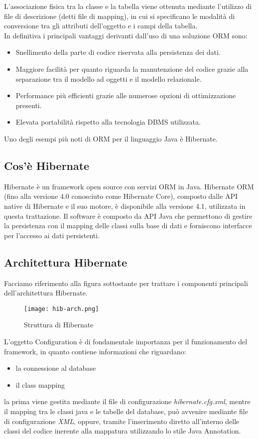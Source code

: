 L'associazione fisica tra la classe e la tabella viene ottenuta mediante l'utilizzo di file di descrizione (detti file di mapping), in cui si specificano le modalit\`a di conversione tra gli attributi dell'oggetto e i campi della tabella.\\In definitiva i principali vantaggi derivanti dall'uso di una soluzione ORM sono:

\begin{itemize}
\item Snellimento della parte di codice riservata alla persistenza dei dati.
\item Maggiore facilit\`a per quanto riguarda la manutenzione del codice grazie alla separazione tra il modello ad oggetti e il modello relazionale.
\item Performance pi\`u efficienti grazie alle numerose opzioni di ottimizzazione presenti.
\item Elevata portabilit\`a rispetto alla tecnologia DBMS utilizzata.
\end{itemize}

Uno degli esempi pi\`u noti di ORM per il linguaggio Java \`e Hibernate.
\subsection{Cos'\`e Hibernate}
Hibernate \`e un framework open source
con servizi ORM in Java. Hibernate ORM (fino alla versione 4.0 conosciuto come Hibernate Core), composto dalle API native di Hibernate e il suo motore, \`e disponibile alla versione 4.1, utilizzata in questa trattazione.
Il software \`e composto da API Java che permettono di gestire la persistenza con il mapping delle classi sulla base di dati e forniscono interfacce per l'accesso ai dati persistenti.
\subsection{Architettura Hibernate}
Facciamo riferimento alla figura sottostante per  trattare i componenti principali dell'architettura Hibernate.

\FloatBarrier
\begin{figure}[H]
\centering%
\texttt{[image: hib-arch.png]}%
\caption{Struttura di Hibernate}\label{fig:hibernate}%
\end{figure}

L'oggetto Configuration \`e di fondamentale importanza per il funzionamento del framework, in quanto contiene informazioni che riguardano:
\begin{itemize}
\item la connessione al database
\item il class mapping
\end{itemize}
la prima viene gestita mediante il file di configurazione \emph{hibernate.cfg.xml}, mentre il mapping tra le classi java e le tabelle del database, pu\`o avvenire mediante file di configurazione \textit{XML}, oppure, tramite l'inserimento diretto all'interno delle classi del codice inerente alla mappatura utilizzando lo stile Java Annotation.

